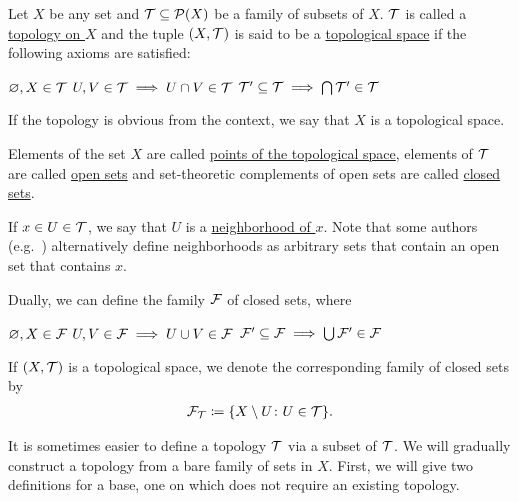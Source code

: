 \begin{definition}\label{def:topological_space}\cite[21]{Lectures:general_topology}
  Let $X$ be any set and $\mathcal T \subseteq \operatorname{\mathcal P}(X)$ be a family of subsets of $X$. $\mathcal T$ is called a \uline{topology on $X$} and the tuple $(X, \mathcal T)$ is said to be a \uline{topological space} if the following axioms are satisfied:
  \begin{description}
     $\varnothing, X \in \mathcal T$
     $U, V \in \mathcal T \implies U \cap V \in \mathcal T$
     $\mathcal T' \subseteq \mathcal T \implies \bigcap \mathcal T' \in \mathcal T$
  \end{description}

  If the topology is obvious from the context, we say that $X$ is a topological space.

  Elements of the set $X$ are called \uline{points of the topological space}, elements of $\mathcal T$ are called \uline{open sets} and set-theoretic complements of open sets are called \uline{closed sets}.

  If $x \in U \in \mathcal T$, we say that $U$ is a \uline{neighborhood of $x$}. Note that some authors (e.g.~\cite[38]{Kelley1955}) alternatively define neighborhoods as arbitrary sets that contain an open set that contains $x$.

  Dually, we can define the family $\mathcal F$ of closed sets, where
  \begin{description}
     $\varnothing, X \in \mathcal F$
     $U, V \in \mathcal F \implies U \cup V \in \mathcal F$
     $\mathcal F' \subseteq \mathcal F \implies \bigcup \mathcal F' \in \mathcal F$
  \end{description}

  If $(X, \mathcal T)$ is a topological space, we denote the corresponding family of closed sets by
  \begin{align*}
    \mathcal F_{\mathcal T} \coloneqq \{ X \setminus U \colon U \in \mathcal T \}.
  \end{align*}
\end{definition}

It is sometimes easier to define a topology $\mathcal T$ via a subset of $\mathcal T$. We will gradually construct a topology from a bare family of sets in $X$. First, we will give two definitions for a base, one on which does not require an existing topology.

